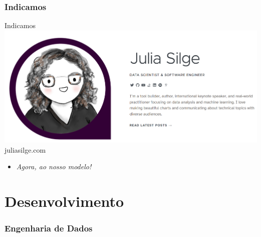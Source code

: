 \documentclass[
  9 pt,
  ignorenonframetext,
]{beamer}
\providecommand{\tightlist}{%
  \setlength{\itemsep}{0pt}\setlength{\parskip}{0pt}}
\begin{document}
\hypertarget{indicamos}{%
\subsubsection{Indicamos}\label{indicamos}}

\begin{frame}{Indicamos}
\includegraphics{./Imagens/juliasilge_mini.png} juliasilge.com

\begin{itemize}
\tightlist
\item
  \emph{Agora, ao nosso modelo!}
\end{itemize}
\end{frame}

\hypertarget{desenvolvimento}{%
\section{Desenvolvimento}\label{desenvolvimento}}

\hypertarget{engenharia-de-dados}{%
\subsubsection{Engenharia de Dados}\label{engenharia-de-dados}}
\end{document}
